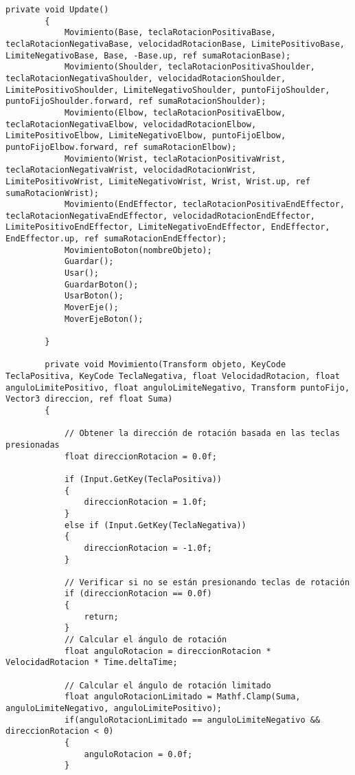 \begin{lstlisting}[frame=single]
        private void Update()
        {
            Movimiento(Base, teclaRotacionPositivaBase, teclaRotacionNegativaBase, velocidadRotacionBase, LimitePositivoBase, LimiteNegativoBase, Base, -Base.up, ref sumaRotacionBase);
            Movimiento(Shoulder, teclaRotacionPositivaShoulder, teclaRotacionNegativaShoulder, velocidadRotacionShoulder, LimitePositivoShoulder, LimiteNegativoShoulder, puntoFijoShoulder, puntoFijoShoulder.forward, ref sumaRotacionShoulder);
            Movimiento(Elbow, teclaRotacionPositivaElbow, teclaRotacionNegativaElbow, velocidadRotacionElbow, LimitePositivoElbow, LimiteNegativoElbow, puntoFijoElbow, puntoFijoElbow.forward, ref sumaRotacionElbow);
            Movimiento(Wrist, teclaRotacionPositivaWrist, teclaRotacionNegativaWrist, velocidadRotacionWrist, LimitePositivoWrist, LimiteNegativoWrist, Wrist, Wrist.up, ref sumaRotacionWrist);
            Movimiento(EndEffector, teclaRotacionPositivaEndEffector, teclaRotacionNegativaEndEffector, velocidadRotacionEndEffector, LimitePositivoEndEffector, LimiteNegativoEndEffector, EndEffector, EndEffector.up, ref sumaRotacionEndEffector);
            MovimientoBoton(nombreObjeto);
            Guardar();
            Usar();
            GuardarBoton();
            UsarBoton();
            MoverEje();
            MoverEjeBoton();
            
        }
    
        private void Movimiento(Transform objeto, KeyCode TeclaPositiva, KeyCode TeclaNegativa, float VelocidadRotacion, float anguloLimitePositivo, float anguloLimiteNegativo, Transform puntoFijo, Vector3 direccion, ref float Suma)
        {
            
            // Obtener la dirección de rotación basada en las teclas presionadas
            float direccionRotacion = 0.0f;

            if (Input.GetKey(TeclaPositiva))
            {
                direccionRotacion = 1.0f;
            }
            else if (Input.GetKey(TeclaNegativa))
            {
                direccionRotacion = -1.0f;
            }

            // Verificar si no se están presionando teclas de rotación
            if (direccionRotacion == 0.0f)
            {
                return;
            }
            // Calcular el ángulo de rotación
            float anguloRotacion = direccionRotacion * VelocidadRotacion * Time.deltaTime;
            
            // Calcular el ángulo de rotación limitado
            float anguloRotacionLimitado = Mathf.Clamp(Suma, anguloLimiteNegativo, anguloLimitePositivo);
            if(anguloRotacionLimitado == anguloLimiteNegativo && direccionRotacion < 0)
            {
                anguloRotacion = 0.0f;
            }


\end{lstlisting}
